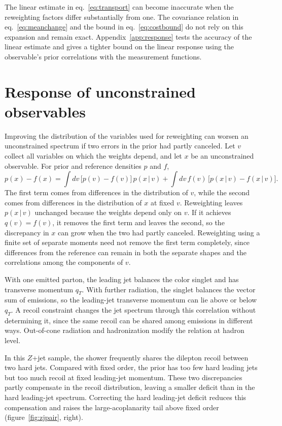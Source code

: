 The linear estimate in eq.~\eqref{eq:transport} can become inaccurate when the reweighting factors differ substantially from one. The covariance relation in eq.~\eqref{eq:meanchange} and the bound in eq.~\eqref{eq:costbound} do not rely on this expansion and remain exact. Appendix~\ref{app:response} tests the accuracy of the linear estimate and gives a tighter bound on the linear response using the observable's prior correlations with the measurement functions.


\section{Response of unconstrained observables}
\label{sec:followers}

Improving the distribution of the variables used for reweighting can worsen an unconstrained spectrum if two errors in the prior had partly canceled. Let $v$ collect all variables on which the weights depend, and let $x$ be an unconstrained observable. For prior and reference densities $p$ and $f$,
\begin{equation}
p(x)-f(x)=\int dv\,\big[p(v)-f(v)\big]\,p(x\,|\,v)
+\int dv\,f(v)\,\big[p(x\,|\,v)-f(x\,|\,v)\big].
\label{eq:twoerrors}
\end{equation}
The first term comes from differences in the distribution of $v$, while the second comes from differences in the distribution of $x$ at fixed $v$. Reweighting leaves $p(x\,|\,v)$ unchanged because the weights depend only on $v$. If it achieves $q(v)=f(v)$, it removes the first term and leaves the second, so the discrepancy in $x$ can grow when the two had partly canceled. Reweighting using a finite set of separate moments need not remove the first term completely, since differences from the reference can remain in both the separate shapes and the correlations among the components of $v$.

With one emitted parton, the leading jet balances the color singlet and has transverse momentum $q_T$. With further radiation, the singlet balances the vector sum of emissions, so the leading-jet transverse momentum can lie above or below $q_T$. A recoil constraint changes the jet spectrum through this correlation without determining it, since the same recoil can be shared among emissions in different ways. Out-of-cone radiation and hadronization modify the relation at hadron level.

In this $Z$+jet sample, the shower frequently shares the dilepton recoil between two hard jets. Compared with fixed order, the prior has too few hard leading jets but too much recoil at fixed leading-jet momentum. These two discrepancies partly compensate in the recoil distribution, leaving a smaller deficit than in the hard leading-jet spectrum. Correcting the hard leading-jet deficit reduces this compensation and raises the large-acoplanarity tail above fixed order (figure~\ref{fig:zjpair}, right).


